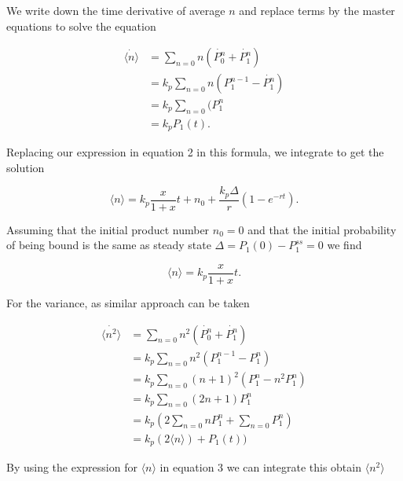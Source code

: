We write down the time derivative of average $n$ and replace terms by the master equations to solve the equation

\begin{equation*}
\begin{aligned}
\dot{ \langle n \rangle } & = \sum_{n=0} n (\dot{P_0^n} + \dot{P_1^n})\\
                          & = k_p \sum_{n=0} n (P_1^{n-1} - \dot{P_1^n})\\
                          & = k_p \sum_{n=0} (P_1^{n}\\
                          & = k_p P_1(t).
\end{aligned}
\end{equation*}

Replacing our expression in equation 2 in this formula, we integrate to get the solution

\begin{equation}
\langle n \rangle = k_p \frac{x}{1+x}t + n_0 + \frac{k_p \Delta}{r}(1-e^{-rt}).
\end{equation}

Assuming that the initial product number $n_0=0$ and that the initial probability of being bound is the same as steady state $\Delta = P_1(0) - P_1^{ss} = 0$ we find

\begin{equation*}
\langle n \rangle = k_p \frac{x}{1+x}t.
\end{equation*}

For the variance, as similar approach can be taken

\begin{equation*}
\begin{aligned}
\dot{ \langle n^2 \rangle } & = \sum_{n=0} n^2 (\dot{P_0^n} + \dot{P_1^n})\\
                          & = k_p \sum_{n=0} n^2 (P_1^{n-1} - P_1^n)\\
                          & = k_p \sum_{n=0} (n+1)^2 (P_1^{n} - n^2 P_1^n)\\
                          & = k_p \sum_{n=0} (2n+1)P_1^{n}\\
                          & = k_p (2 \sum_{n=0}nP_1^{n} + \sum_{n=0}P_1^{n})\\
                          & = k_p (2 \langle n \rangle) + P_1(t))
\end{aligned}
\end{equation*}

By using the expression for $\langle n \rangle$ in equation 3 we can integrate this obtain $\langle n^2 \rangle$


